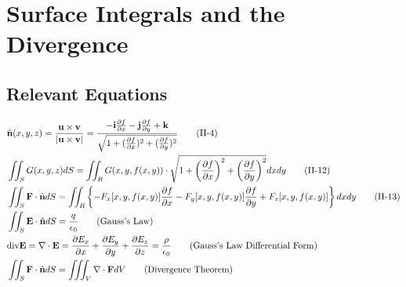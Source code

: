\documentclass{article}
\begin{document}
\section{Surface Integrals and the Divergence}
\subsection*{Relevant Equations}
\begin{align*}
    &\hat{\textbf{n}}(x,y,z) = \frac{\textbf{u} \times \textbf{v}}{|\textbf{u} \times \textbf{v}|} = \frac{-\textbf{i}\frac{\partial{f}}{\partial{x}} -\textbf{j}\frac{\partial{f}}{\partial{y}} + \textbf{k}} {\sqrt{1 + (\frac{\partial{f}}{\partial{x}})^2 + (\frac{\partial{f}}{\partial{y}})^2 }} \tag{II-4} \\
    &\iint_S{G(x,y,z)}dS = \iint_R{G(x,y,f(x,y))} \cdot \sqrt{1 + {\left( \frac{\partial{f}}{\partial{x}} \right)}^2 + {\left( \frac{\partial{f}}{\partial{y}} \right)}^2}dxdy \tag{II-12} \\
    &\iint_S \textbf{F} \cdot \hat{\textbf{n}} dS = \iint_R \left\{ -F_x[x,y,f(x,y)]\frac{\partial{f}}{\partial{x}} - F_y[x,y,f(x,y)]\frac{\partial{f}}{\partial{y}} + F_z[x,y,f(x,y)] \right\} dxdy \tag{II-13}\label{II-13} \\
    &\iint_S \textbf{E} \cdot \hat{\textbf{n}} dS = \frac{q}{\epsilon_0} \tag{Gauss's Law}\label{Gauss} \\
    &\textnormal{div} \textbf{E} = \nabla \cdot \textbf{E} = \frac{\partial{E_x}}{\partial{x}} + \frac{\partial{E_y}}{\partial{y}} + \frac{\partial{E_z}}{\partial{z}} = \frac{\rho}{\epsilon_0} \tag{Gauss's Law Differential Form} \\
    &\iint_S \textbf{F} \cdot \hat{\textbf{n}} dS = \iiint_V \nabla \cdot \textbf{F} dV \tag{Divergence Theorem} \\
\end{align*}
\end{document}
